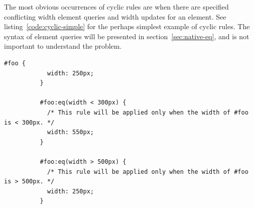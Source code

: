 \documentclass[a4paper,11pt]{kth-mag}
\begin{document}
        The most obvious occurrences of cyclic rules are when there are specified conflicting width element queries and width updates for an \gls{element}.
        See listing~\ref{code:cyclic-simple} for the perhaps simplest example of cyclic rules.
        The syntax of element queries will be presented in section~\ref{sec:native-eq}, and is not important to understand the problem.
        \begin{lstlisting}[gobble=10,caption={Simple example of cyclic rules with directly conflicting width element queries and updates.}, captionpos=b, label={code:cyclic-simple}]
          #foo {
            width: 250px;
          }

          #foo:eq(width < 300px) {
            /* This rule will be applied only when the width of #foo is < 300px. */
            width: 550px;
          }

          #foo:eq(width > 500px) {
            /* This rule will be applied only when the width of #foo is > 500px. */
            width: 250px;
          }
        \end{lstlisting}
\end{document}
